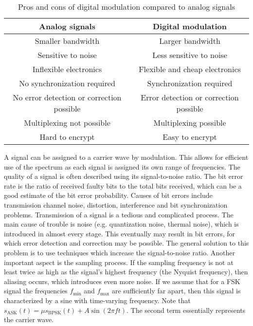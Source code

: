 \documentclass[11pt,titlepage]{report}
\begin{document}
\begin{table}[H]
	\centering
	\caption{Pros and cons of digital modulation compared to analog signals}
	\label{tab:pros-cons}
	\begin{tabular}{c c}
		\hline\hline
		Analog signals & Digital modulation \\
		\hline
		Smaller bandwidth & Larger bandwidth \\
		Sensitive to noise & Less sensitive to noise \\
		Inflexible electronics & Flexible and cheap electronics \\
		No synchronization required & Synchronization required \\
		No error detection or correction possible & Error detection or correction possible \\
		Multiplexing not possible & Multiplexing possible \\
		Hard to encrypt & Easy to encrypt \\
		\hline
	\end{tabular}
\end{table}
A signal can be assigned to a carrier wave by modulation. This allows for efficient use of the spectrum as each signal is assigned its own range of frequencies. The quality of a signal is often described using its signal-to-noise ratio. The bit error rate is the ratio of received faulty bits to the total bits received, which can be a good estimate of the bit error probability. Causes of bit errors include transmission channel noise, distortion, interference and bit synchronization problems. 
Transmission of a signal is a tedious and complicated process. The main cause of trouble is noise (e.g. quantization noise, thermal noise), which is introduced in almost every stage. This eventually may result in bit errors, for which error detection and correction may be possible. The general solution to this problem is to use techniques which increase the signal-to-noise ratio. Another important aspect is the sampling process. If the sampling frequency is not at least twice as high as the signal's highest frequency (the Nyquist frequency), then aliasing occurs, which introduces even more noise.
If we assume that for a FSK signal the frequencies $f_{\text{min}}$ and $f_{\text{max}}$ are sufficiently far apart, then this signal is characterized by a sine with time-varying frequency. Note that $s_{\text{ASK}}(t) = \mu s_{\text{BPSK}}(t) + A \sin{(2 \pi f t)}$. The second term essentially represents the carrier wave.
\end{document}
